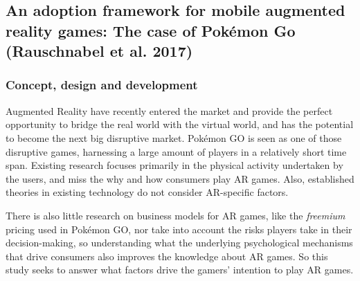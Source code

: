\documentclass[runningheads]{llncs}
\begin{document}

\subsection{An adoption framework for mobile augmented reality games: The case of Pokémon Go (Rauschnabel et al. 2017)}

\subsubsection{Concept, design and development}
\par Augmented Reality have recently entered the market and provide the perfect opportunity to bridge the real world with the virtual world, and has the potential to become the next big disruptive market. Pokémon GO is seen as one of those disruptive games, harnessing a large amount of players in a relatively short time span. Existing research focuses primarily in the physical activity undertaken by the users, and miss the why and how consumers play AR games. Also, established theories in existing technology do not consider AR-specific factors.
\par There is also little research on business models for AR games, like the \textit{freemium} pricing used in Pokémon GO, nor take into account the risks players take in their decision-making, so understanding what the underlying psychological mechanisms that drive consumers also improves the knowledge about AR games. So this study seeks to answer what factors drive the gamers' intention to play AR games.
\end{document}
